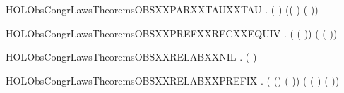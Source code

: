 \newcommand{\HOLObsCongrLawsTheoremsOBSXXPARXXTAUXXPREF}{\UseVerbatim{HOLObsCongrLawsTheoremsOBSXXPARXXTAUXXPREF}}
\begin{SaveVerbatim}{HOLObsCongrLawsTheoremsOBSXXPARXXTAUXXTAU}
\HOLTokenTurnstile{} \HOLSymConst{\HOLTokenForall{}} .
        (\HOLConst{\ensuremath{\tau}} \HOLSymConst{\ensuremath{\parallel}} \HOLConst{\ensuremath{\tau}})
         (\HOLConst{\ensuremath{\tau}}( \HOLSymConst{\ensuremath{\parallel}} \HOLConst{\ensuremath{\tau}}) \HOLSymConst{+} \HOLConst{\ensuremath{\tau}}(\HOLConst{\ensuremath{\tau}} \HOLSymConst{\ensuremath{\parallel}} ))
\end{SaveVerbatim}
\newcommand{\HOLObsCongrLawsTheoremsOBSXXPARXXTAUXXTAU}{\UseVerbatim{HOLObsCongrLawsTheoremsOBSXXPARXXTAUXXTAU}}
\begin{SaveVerbatim}{HOLObsCongrLawsTheoremsOBSXXPREFXXRECXXEQUIV}
\HOLTokenTurnstile{} \HOLSymConst{\HOLTokenForall{}}  .
        (  ( )) (  ( ))
\end{SaveVerbatim}
\newcommand{\HOLObsCongrLawsTheoremsOBSXXPREFXXRECXXEQUIV}{\UseVerbatim{HOLObsCongrLawsTheoremsOBSXXPREFXXRECXXEQUIV}}
\begin{SaveVerbatim}{HOLObsCongrLawsTheoremsOBSXXRELABXXNIL}
\HOLTokenTurnstile{} \HOLSymConst{\HOLTokenForall{}}.  (  ) 
\end{SaveVerbatim}
\newcommand{\HOLObsCongrLawsTheoremsOBSXXRELABXXNIL}{\UseVerbatim{HOLObsCongrLawsTheoremsOBSXXRELABXXNIL}}
\begin{SaveVerbatim}{HOLObsCongrLawsTheoremsOBSXXRELABXXPREFIX}
\HOLTokenTurnstile{} \HOLSymConst{\HOLTokenForall{}}  .
        ( () ( ))
         ( ( )   ( ))
\end{SaveVerbatim}
